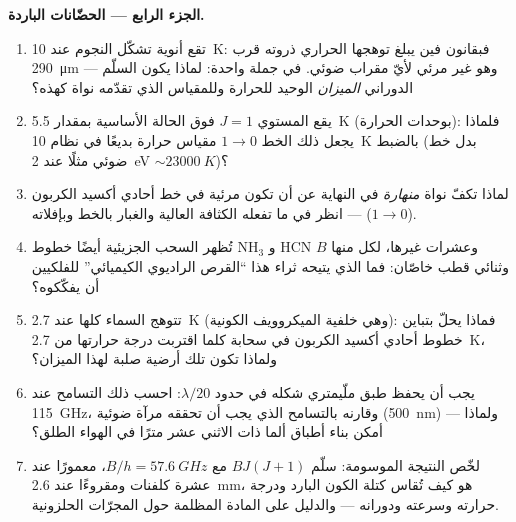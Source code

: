 \begin{problem}
\medskip\noindent\textbf{الجزء الرابع --- الحضّانات الباردة.}
\begin{enumerate}[resume]
  \item تقع أنوية تشكّل النجوم عند \qty{10}{K}: فبقانون فين
        يبلغ توهجها الحراري ذروته قرب \qty{290}{\micro m} ---
        وهو غير مرئي لأيّ مقراب ضوئي. في جملة واحدة: لماذا
        يكون السلّم الدوراني \emph{الميزان} الوحيد للحرارة
        وللمقياس الذي تقدّمه نواة كهذه؟
  \item يقع المستوي $J = 1$ فوق الحالة الأساسية بمقدار \qty{5.5}{K}
        (بوحدات الحرارة): فلماذا يجعل ذلك الخط $1\to0$
        مقياس حرارة بديعًا في نظام \qty{10}{K} بالضبط
        (بدل خط ضوئي مثلًا عند
        \qty{2}{eV} $\sim \qty{23000}{K}$)؟
  \item لماذا تكفّ نواة \emph{منهارة} في النهاية عن أن تكون
        مرئية في خط أحادي أكسيد الكربون ($1\to0$) --- انظر في ما تفعله الكثافة
        العالية والغبار بالخط وبإفلاته.
  \item تُظهر السحب الجزيئية أيضًا خطوط NH$_3$ و HCN وعشرات
        غيرها، لكل منها $B$ وثنائي قطب خاصّان: فما الذي يتيحه
        ثراء هذا ``القرص الراديوي الكيميائي'' للفلكيين أن يفكّكوه؟
  \item تتوهج السماء كلها عند \qty{2.7}{K} (وهي خلفية الميكروويف
        الكونية): فماذا يحلّ بتباين خطوط أحادي أكسيد الكربون في سحابة
        كلما اقتربت درجة حرارتها من
        \qty{2.7}{K}، ولماذا تكون تلك أرضية صلبة لهذا
        الميزان؟
  \item يجب أن يحفظ طبق ملّيمتري شكله في حدود
        $\lambda/20$: احسب ذلك التسامح عند \qty{115}{GHz}،
        وقارنه بالتسامح الذي يجب أن تحققه مرآة ضوئية
        (\qty{500}{nm}) --- ولماذا أمكن بناء أطباق ألما
        ذات الاثني عشر مترًا في الهواء الطلق؟
  \item لخّص النتيجة الموسومة: سلّم $BJ(J+1)$ مع $B/h =
        \qty{57.6}{GHz}$، معمورًا عند عشرة كلفنات ومقروءًا عند
        \qty{2.6}{mm}، هو كيف تُقاس كتلة الكون البارد ودرجة
        حرارته وسرعته ودورانه --- والدليل على المادة
        المظلمة حول المجرّات الحلزونية.
\end{enumerate}
\end{problem}
